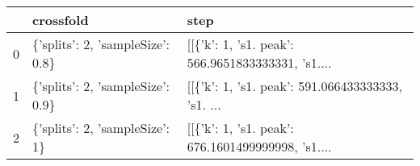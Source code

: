 \begin{tabular}{lll}
\toprule
{} &                         crossfold &                                               step \\
\midrule
0 &  \{'splits': 2, 'sampleSize': 0.8\} &  [[\{'k': 1, 's1. peak': 566.9651833333331, 's1.... \\
1 &  \{'splits': 2, 'sampleSize': 0.9\} &  [[\{'k': 1, 's1. peak': 591.066433333333, 's1. ... \\
2 &    \{'splits': 2, 'sampleSize': 1\} &  [[\{'k': 1, 's1. peak': 676.1601499999998, 's1.... \\
\bottomrule
\end{tabular}
